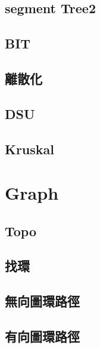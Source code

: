 \documentclass[a4paper,10pt,twocolumn,oneside]{article}
\begin{document}
    \subsection{segment Tree2}
    

    \subsection{BIT}
    

    \subsection{離散化}
    

    \subsection{DSU}
    

    \subsection{Kruskal}
    

\section{Graph}

    \subsection{Topo}
    

    \subsection{找環}
    

    \subsection{無向圖環路徑}
    

    \subsection{有向圖環路徑}
    
\end{document}
